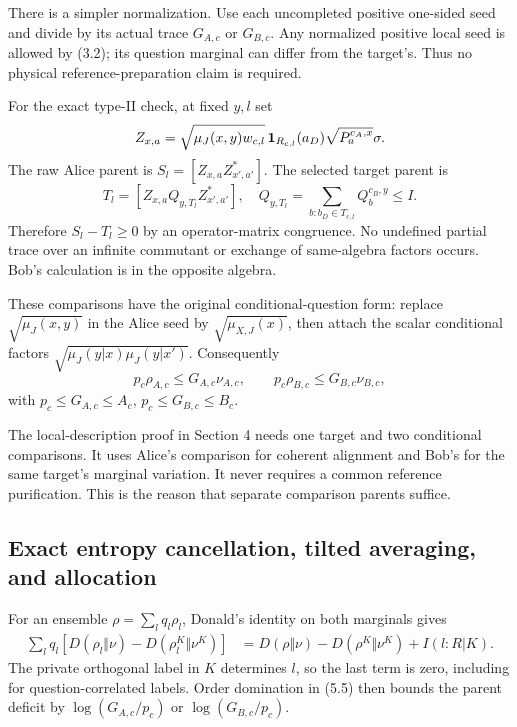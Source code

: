 \documentclass[11pt,reqno]{amsart}
\numberwithin{equation}{section}
\begin{document}
There is a simpler normalization. Use each uncompleted positive one-sided seed and divide by its actual trace \(G_{A,c}\) or \(G_{B,c}\). Any normalized positive local seed is allowed by (3.2); its question marginal can differ from the target's. Thus no physical reference-preparation claim is required.

For the exact type-II check, at fixed \(y,l\) set \[
 Z_{x,a}=\sqrt{\mu_J(x,y)w_{c,l}}\,
          {\bf1}_{R_{c,l}}(a_D)\sqrt{P_a^{c_A,x}}\sigma .
\] The raw Alice parent is \(S_l=[Z_{x,a}Z_{x',a'}^*]\). The selected target parent is \[
 T_l=[Z_{x,a}Q_{y,T_l}Z_{x',a'}^*],
 \quad Q_{y,T_l}=\sum_{b:b_D\in T_{c,l}}Q_b^{c_B,y}\le I.
\] Therefore \(S_l-T_l\ge0\) by an operator-matrix congruence. No undefined partial trace over an infinite commutant or exchange of same-algebra factors occurs. Bob's calculation is in the opposite algebra.

These comparisons have the original conditional-question form: replace \(\sqrt{\mu_J(x,y)}\) in the Alice seed by \(\sqrt{\mu_{X,J}(x)}\), then attach the scalar conditional factors \(\sqrt{\mu_J(y|x)\mu_J(y|x')}\). Consequently \[
 p_c\rho_{A,c}\le G_{A,c}\nu_{A,c},\qquad
 p_c\rho_{B,c}\le G_{B,c}\nu_{B,c}, \tag{5.5}
\] with \(p_c\le G_{A,c}\le A_c\), \(p_c\le G_{B,c}\le B_c\).

The local-description proof in Section 4 needs one target and two conditional comparisons. It uses Alice's comparison for coherent alignment and Bob's for the same target's marginal variation. It never requires a common reference purification. This is the reason that separate comparison parents suffice.

\subsection{Exact entropy cancellation, tilted averaging, and allocation}\label{exact-entropy-cancellation-tilted-averaging-and-allocation}

For an ensemble \(\rho=\sum_lq_l\rho_l\), Donald's identity on both marginals gives \[
 \begin{split}
 \sum_lq_l[D(\rho_l\Vert\nu)-D(\rho_l^K\Vert\nu^K)]
 &=D(\rho\Vert\nu)-D(\rho^K\Vert\nu^K)
       +I(l:R|K).
 \end{split} \tag{5.6}
\] The private orthogonal label in \(K\) determines \(l\), so the last term is zero, including for question-correlated labels. Order domination in (5.5) then bounds the parent deficit by \(\log(G_{A,c}/p_c)\) or \(\log(G_{B,c}/p_c)\).
\end{document}
